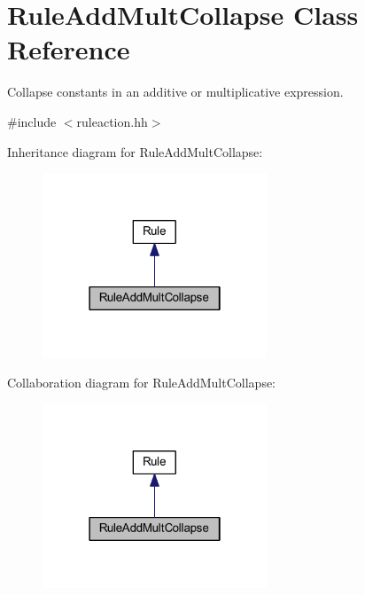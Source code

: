 \hypertarget{class_rule_add_mult_collapse}{}\section{Rule\+Add\+Mult\+Collapse Class Reference}
\label{class_rule_add_mult_collapse}


Collapse constants in an additive or multiplicative expression.  




{\ttfamily \#include $<$ruleaction.\+hh$>$}



Inheritance diagram for Rule\+Add\+Mult\+Collapse\+:
\nopagebreak
\begin{figure}[H]
\begin{center}
\leavevmode
\includegraphics[width=190pt]{class_rule_add_mult_collapse__inherit__graph}
\end{center}
\end{figure}


Collaboration diagram for Rule\+Add\+Mult\+Collapse\+:
\nopagebreak
\begin{figure}[H]
\begin{center}
\leavevmode
\includegraphics[width=190pt]{class_rule_add_mult_collapse__coll__graph}
\end{center}
\end{figure}
